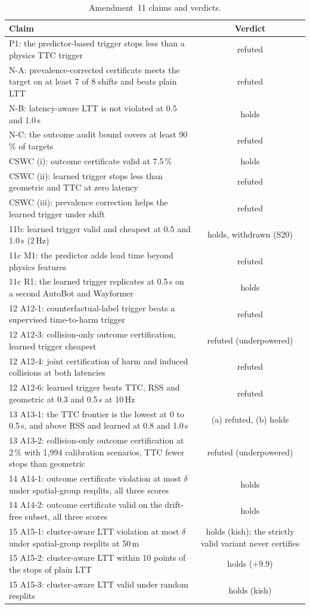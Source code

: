 \documentclass[lettersize,journal]{IEEEtran}
\begin{document}
\begin{table}[h]
\caption{Amendment~11 claims and verdicts.}
\label{tab:ledger}
\centering
\scriptsize\setlength{\tabcolsep}{2.5pt}
\begin{tabular}{p{5.2cm}c}
\toprule
Claim & Verdict \\
\midrule
P1: the predictor-based trigger stops less than a physics TTC trigger & refuted \\
N-A: prevalence-corrected certificate meets the target on at least 7 of 8 shifts and beats plain LTT & refuted \\
N-B: latency-aware LTT is not violated at 0.5 and 1.0\,s & holds \\
N-C: the outcome audit bound covers at least 90\,\% of targets & refuted \\
CSWC (i): outcome certificate valid at 7.5\,\% & holds \\
CSWC (ii): learned trigger stops less than geometric and TTC at zero latency & refuted \\
CSWC (iii): prevalence correction helps the learned trigger under shift & refuted \\
11b: learned trigger valid and cheapest at 0.5 and 1.0\,s (2\,Hz) & holds, withdrawn (S20) \\
11c M1: the predictor adds lead time beyond physics features & refuted \\
11c R1: the learned trigger replicates at 0.5\,s on a second AutoBot and Wayformer & holds \\
12 A12-1: counterfactual-label trigger beats a supervised time-to-harm trigger & refuted \\
12 A12-3: collision-only outcome certification, learned trigger cheapest & refuted (underpowered) \\
12 A12-4: joint certification of harm and induced collisions at both latencies & refuted \\
12 A12-6: learned trigger beats TTC, RSS and geometric at 0.3 and 0.5\,s at 10\,Hz & refuted \\
13 A13-1: the TTC frontier is the lowest at 0 to 0.5\,s, and above RSS and learned at 0.8 and 1.0\,s & (a) refuted, (b) holds \\
13 A13-2: collision-only outcome certification at 2\,\% with 1{,}994 calibration scenarios, TTC fewer stops than geometric & refuted (underpowered) \\
14 A14-1: outcome certificate violation at most $\delta$ under spatial-group resplits, all three scores & holds \\
14 A14-2: outcome certificate valid on the drift-free subset, all three scores & holds \\
15 A15-1: cluster-aware LTT violation at most $\delta$ under spatial-group resplits at 50\,m & holds (kish); the strictly valid variant never certifies \\
15 A15-2: cluster-aware LTT within 10 points of the stops of plain LTT & holds (+9.9) \\
15 A15-3: cluster-aware LTT valid under random resplits & holds (kish) \\
\bottomrule
\end{tabular}
\end{table}
\end{document}
